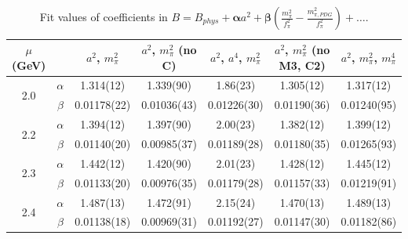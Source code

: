 \documentclass[12pt]{extarticle}
\begin{document}
\begin{table}[h!]
\begin{center}
\begin{tabular}{|c c|c|c|c|c|c|}
\hline
$\mu$ (GeV) &  & $a^2$, $m_\pi^2$& $a^2$, $m_\pi^2$ (no C)& $a^2$, $a^4$, $m_\pi^2$& $a^2$, $m_\pi^2$ (no M3, C2)& $a^2$, $m_\pi^2$, $m_\pi^4$\\
\hline
\multirow{2}{0.5in}{2.0} & $\alpha$ & 1.314(12)& 1.339(90)& 1.86(23)& 1.305(12)& 1.317(12)\\
 & $\beta$ & 0.01178(22)& 0.01036(43)& 0.01226(30)& 0.01190(36)& 0.01240(95)\\
\hline
\multirow{2}{0.5in}{2.2} & $\alpha$ & 1.394(12)& 1.397(90)& 2.00(23)& 1.382(12)& 1.399(12)\\
 & $\beta$ & 0.01140(20)& 0.00985(37)& 0.01189(28)& 0.01180(35)& 0.01265(93)\\
\hline
\multirow{2}{0.5in}{2.3} & $\alpha$ & 1.442(12)& 1.420(90)& 2.01(23)& 1.428(12)& 1.445(12)\\
 & $\beta$ & 0.01133(20)& 0.00976(35)& 0.01179(28)& 0.01157(33)& 0.01219(91)\\
\hline
\multirow{2}{0.5in}{2.4} & $\alpha$ & 1.487(13)& 1.472(91)& 2.15(24)& 1.470(13)& 1.489(13)\\
 & $\beta$ & 0.01138(18)& 0.00969(31)& 0.01192(27)& 0.01147(30)& 0.01182(86)\\
\hline
\end{tabular}
\caption{Fit values of coefficients in $B = B_{phys} + \mathbf{\alpha} a^2 + \mathbf{\beta}\left(\frac{m_\pi^2}{f_\pi^2}-\frac{m_{\pi,PDG}^2}{f_\pi^2}\right) + \ldots$.}
\end{center}
\end{table}




















\clearpage
\end{document}
